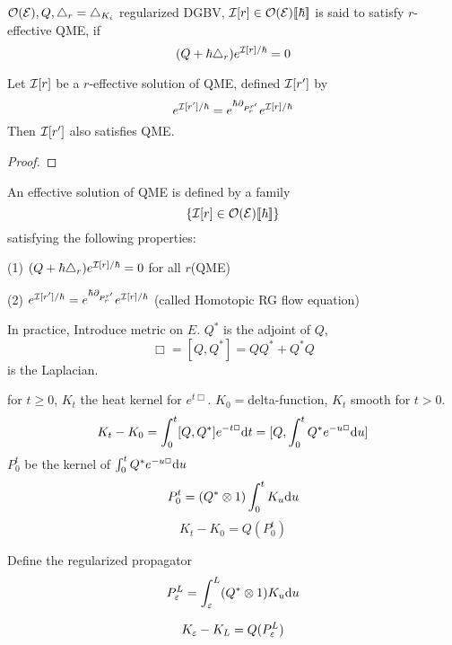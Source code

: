 
\begin{definition}
$\mathcal{O}(\mathcal{E}),Q,\triangle_r=\triangle_{K_i}$ regularized DGBV,
$\mathcal{I}[r]\in\mathcal{O}(\mathcal{E})[\![\hbar]\!]$ is said to satisfy
$r$-effective QME, if
$$(Q+\hbar\triangle_r)e^{\mathcal{I}[r]/\hbar}=0$$
\end{definition}
\begin{prop}
Let $\mathcal{I}[r]$ be a $r$-effective solution of QME, defined
$\mathcal{I}[r']$ by
$$e^{\mathcal{I}[r']/\hbar}=e^{\hbar\partial_{P_r^{r'}}}e^{\mathcal{I}[r]/\hbar}$$
Then $\mathcal{I}[r']$ also satisfies QME.
\end{prop}

\begin{proof}
\end{proof}

\begin{definition}
An effective solution of QME is defined by a family
$$\{\mathcal{I}[r]\in\mathcal{O}(\mathcal{E})[\![\hbar]\!]\}$$
satisfying the following properties:

(1) $(Q+\hbar\triangle_r)e^{\mathcal{I}[r]/\hbar}=0$ for all $r$(QME)

(2) $e^{\mathcal{I}[r']/\hbar}=e^{\hbar\partial_{P_r^{r'}}}e^{\mathcal{I}[r]/\hbar}$
(called Homotopic RG flow equation)
\end{definition}

In practice, Introduce metric on $E$. $Q^*$ is the adjoint of $Q$,
$$\Box=[Q,Q^*]=QQ^*+Q^*Q$$
is the Laplacian.

for $t\geq 0$, $K_t$ the heat kernel for $e^{t\Box}$.
$K_0=$delta-function, $K_t$ smooth for $t>0$.
$$K_t-K_0=
\int_0^t[Q,Q^*]e^{-t\Box}\mathrm{d} t
=[Q,\int_0^tQ^*e^{-u\Box}\mathrm{d} u]$$
$P_0^t$ be the kernel of $\int_0^tQ^*e^{-u\Box}\mathrm{d} u$
$$P_0^t=(Q^*\otimes 1)\int_0^tK_u\mathrm{d} u$$
$$K_t-K_0=Q(P_0^t)$$

Define the regularized propagator
$$P_\varepsilon^L=\int_\varepsilon^L(Q^*\otimes 1)K_u\mathrm{d} u$$

$$K_\varepsilon-K_L=Q(P_{\varepsilon}^L)$$








